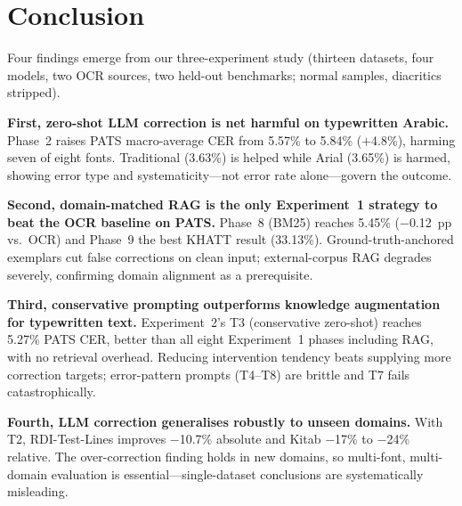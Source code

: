 \documentclass[conference]{IEEEtran}
\begin{document}
\section{Conclusion}

Four findings emerge from our three-experiment study (thirteen datasets,
four models, two OCR sources, two held-out benchmarks; normal samples,
diacritics stripped).

\textbf{First, zero-shot LLM correction is net harmful on typewritten Arabic.}
Phase~2 raises PATS macro-average CER from 5.57\% to 5.84\% ($+$4.8\%), harming
seven of eight fonts. Traditional (3.63\%) is helped while Arial (3.65\%) is
harmed, showing error type and systematicity---not error rate alone---govern
the outcome.

\textbf{Second, domain-matched RAG is the only Experiment~1 strategy to beat
the OCR baseline on PATS.} Phase~8 (BM25) reaches 5.45\% ($-$0.12~pp vs.\ OCR)
and Phase~9 the best KHATT result (33.13\%). Ground-truth-anchored exemplars cut
false corrections on clean input; external-corpus RAG degrades severely,
confirming domain alignment as a prerequisite.

\textbf{Third, conservative prompting outperforms knowledge augmentation for
typewritten text.} Experiment~2's T3 (conservative zero-shot) reaches 5.27\%
PATS CER, better than all eight Experiment~1 phases including RAG, with no
retrieval overhead. Reducing intervention tendency beats supplying more
correction targets; error-pattern prompts (T4--T8) are brittle and T7 fails
catastrophically.

\textbf{Fourth, LLM correction generalises robustly to unseen domains.}
With T2, RDI-Test-Lines improves $-$10.7\% absolute and Kitab $-$17\% to
$-$24\% relative. The over-correction finding holds in new domains, so
multi-font, multi-domain evaluation is essential---single-dataset conclusions
are systematically misleading.
\end{document}
